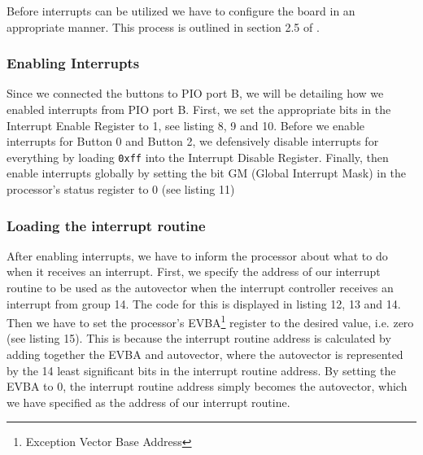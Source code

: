 Before interrupts can be utilized we have to configure the board in an appropriate manner. This process is outlined in section 2.5 of \cite{lab-compendium}.
\subsubsection{Enabling Interrupts}
Since we connected the buttons to PIO port B, we will be detailing how we enabled interrupts from PIO port B.
First, we set the appropriate bits in the Interrupt Enable Register to 1, see listing 8, 9 and 10.
Before we enable interrupts for Button 0 and Button 2, we defensively disable interrupts for everything by loading \texttt{0xff} into the Interrupt Disable Register.
Finally, then enable interrupts globally by setting the bit GM (Global Interrupt Mask) in the processor's status register to 0 (see listing 11) %
\subsubsection{Loading the interrupt routine}
After enabling interrupts, we have to inform the processor about what to do when it receives an interrupt.
First, we specify the address of our interrupt routine to be used as the autovector when the interrupt controller receives an interrupt from group 14. The code for this is displayed in listing 12, 13 and 14.
Then we have to set the processor's EVBA\footnote{Exception Vector Base Address} register to the desired value, i.e. zero (see listing 15).
This is because the interrupt routine address is calculated by adding together the EVBA and autovector, where the autovector is represented by the 14 least significant bits in the interrupt routine address.
By setting the EVBA to 0, the interrupt routine address simply becomes the autovector, which we have specified as the address of our interrupt routine.
